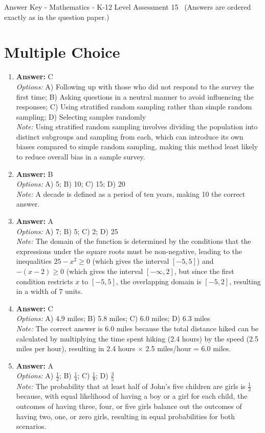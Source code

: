 \documentclass[12pt]{article}
\begin{document}
\begin{center}
Answer Key - Mathematics - K-12 Level Assessment 15 \
\small (Answers are ordered exactly as in the question paper.)
\end{center}

\section*{Multiple Choice}
\begin{enumerate}[label=\arabic*.]
\item \textbf{Answer:} C
\\ \textit{Options:} A) Following up with those who did not respond to the survey the first time; B) Asking questions in a neutral manner to avoid influencing the responses; C) Using stratified random sampling rather than simple random sampling; D) Selecting samples randomly
\\ \textit{Note:} Using stratified random sampling involves dividing the population into distinct subgroups and sampling from each, which can introduce its own biases compared to simple random sampling, making this method least likely to reduce overall bias in a sample survey.
\item \textbf{Answer:} B
\\ \textit{Options:} A) 5; B) 10; C) 15; D) 20
\\ \textit{Note:} A decade is defined as a period of ten years, making 10 the correct answer.
\item \textbf{Answer:} A
\\ \textit{Options:} A) 7; B) 5; C) 2; D) 25
\\ \textit{Note:} The domain of the function is determined by the conditions that the expressions under the square roots must be non-negative, leading to the inequalities \(25 - x^2 \geq 0\) (which gives the interval \([-5, 5]\)) and \(-(x - 2) \geq 0\) (which gives the interval \([-\infty, 2]\), but since the first condition restricts \(x\) to \([-5, 5]\), the overlapping domain is \([-5, 2]\), resulting in a width of \(7\) units.
\item \textbf{Answer:} C
\\ \textit{Options:} A) 4.9 miles; B) 5.8 miles; C) 6.0 miles; D) 6.3 miles
\\ \textit{Note:} The correct answer is 6.0 miles because the total distance hiked can be calculated by multiplying the time spent hiking (2.4 hours) by the speed (2.5 miles per hour), resulting in 2.4 hours × 2.5 miles/hour = 6.0 miles.
\item \textbf{Answer:} A
\\ \textit{Options:} A) \ensuremath{\frac{1}{2}}; B) \ensuremath{\frac{1}{4}}; C) \ensuremath{\frac{1}{8}}; D) \ensuremath{\frac{3}{5}}
\\ \textit{Note:} The probability that at least half of John's five children are girls is \(\frac{1}{2}\) because, with equal likelihood of having a boy or a girl for each child, the outcomes of having three, four, or five girls balance out the outcomes of having two, one, or zero girls, resulting in equal probabilities for both scenarios.
\end{enumerate}
\end{document}
